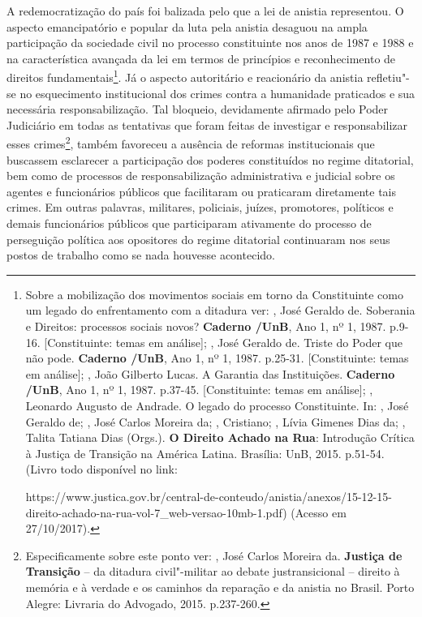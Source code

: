A redemocratização do país foi balizada pelo que a lei de anistia
representou. O aspecto emancipatório e popular da luta pela anistia
desaguou na ampla participação da sociedade civil no processo
constituinte nos anos de 1987 e 1988 e na característica avançada da lei
em termos de princípios e reconhecimento de direitos
fundamentais\footnote{Sobre a mobilização dos movimentos sociais em
  torno da Constituinte como um legado do enfrentamento com a ditadura
  ver:  , José Geraldo de. Soberania e Direitos: processos
  sociais novos? \textbf{Caderno /UnB}, Ano 1, nº 1, 1987. p.9-16.
  {[}Constituinte: temas em análise{]};  , José Geraldo de.
  Triste do Poder que não pode. \textbf{Caderno /UnB}, Ano 1, nº 1,
  1987. p.25-31. {[}Constituinte: temas em análise{]}; , João
  Gilberto Lucas. A Garantia das Instituições. \textbf{Caderno
  /UnB}, Ano 1, nº 1, 1987. p.37-45. {[}Constituinte: temas em
  análise{]}; , Leonardo Augusto de Andrade. O legado do processo
  Constituinte. In:  , José Geraldo de;  , José
  Carlos Moreira da; , Cristiano; , Lívia Gimenes Dias da;
  , Talita Tatiana Dias (Orgs.). \textbf{O Direito Achado na Rua}:
  Introdução Crítica à Justiça de Transição na América Latina. Brasília:
  UnB, 2015. p.51-54. (Livro todo disponível no link:

  https://www.justica.gov.br/central-de-conteudo/anistia/anexos/15-12-15-direito-achado-na-rua-vol-7\_web-versao-10mb-1.pdf)
  (Acesso em 27/10/2017).}. Já o aspecto autoritário e reacionário
da anistia refletiu"-se no esquecimento institucional dos crimes contra a
humanidade praticados e sua necessária responsabilização. Tal bloqueio,
devidamente afirmado pelo Poder Judiciário em todas as tentativas que
foram feitas de investigar e responsabilizar esses crimes\footnote{Especificamente
  sobre este ponto ver:  , José Carlos Moreira da.
  \textbf{Justiça de Transição} -- da ditadura civil"-militar ao debate
  justransicional -- direito à memória e à verdade e os caminhos da
  reparação e da anistia no Brasil. Porto Alegre: Livraria do Advogado,
  2015. p.237-260.}, também favoreceu a ausência de reformas
institucionais que buscassem esclarecer a participação dos poderes
constituídos no regime ditatorial, bem como de processos de
responsabilização administrativa e judicial sobre os agentes e
funcionários públicos que facilitaram ou praticaram diretamente tais
crimes. Em outras palavras, militares, policiais, juízes, promotores,
políticos e demais funcionários públicos que participaram ativamente do
processo de perseguição política aos opositores do regime ditatorial
continuaram nos seus postos de trabalho como se nada houvesse
acontecido.

